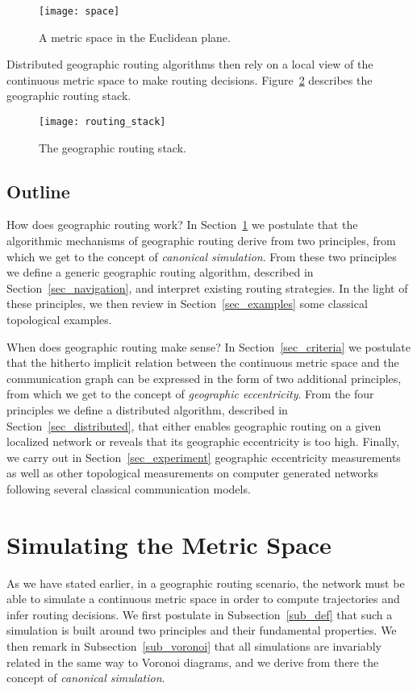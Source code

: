 \documentclass{article}
\begin{document}
\begin{figure}[h]
\begin{center}
\texttt{[image: space]}
\caption{A metric space  in the Euclidean plane.}
\label{fig_space}
\end{center}
\end{figure}

Distributed geographic routing algorithms then rely on a local view of the continuous metric space  to make routing decisions. Figure~\ref{fig_stack} describes the geographic routing stack.

\begin{figure}[ħtb]
\begin{center}
\texttt{[image: routing\_stack]}
\caption{The geographic routing stack.}
\label{fig_stack}
\end{center}
\end{figure}

\subsection*{Outline}

How does geographic routing work? In Section~\ref{sec_simul_metric} we postulate that the algorithmic mechanisms of geographic routing derive from two principles, from which we get to the concept of {\em canonical simulation}. From these two principles we define a generic geographic routing algorithm, described in Section~\ref{sec_navigation}, and interpret existing routing strategies. In the light of these principles, we then review in Section~\ref{sec_examples} some classical topological examples.

When does geographic routing make sense? In Section~\ref{sec_criteria} we postulate that the hitherto implicit relation between the continuous metric space and the communication graph can be expressed in the form of two additional principles, from which we get to the concept of {\em geographic eccentricity}. From the four principles we define a distributed algorithm, described in Section~\ref{sec_distributed}, that either enables geographic routing on a given localized network or reveals that its geographic eccentricity is too high. Finally, we carry out in Section~\ref{sec_experiment} geographic eccentricity measurements as well as other topological measurements on computer generated networks following several classical communication models.

\section{Simulating the Metric Space}
\label{sec_simul_metric}
As we have stated earlier, in a geographic routing scenario, the network must be able to simulate a continuous metric space  in order to compute trajectories and infer routing decisions. We first postulate in Subsection~\ref{sub_def} that such a simulation is built around two principles and their fundamental properties. We then remark in Subsection~\ref{sub_voronoi} that all simulations are invariably related in the same way to Voronoi diagrams, and we derive from there the concept of {\em canonical simulation}.
\end{document}
